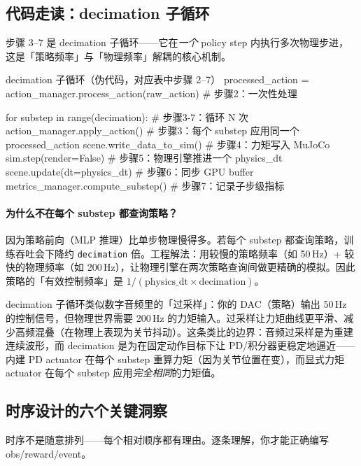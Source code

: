 \subsection{代码走读：decimation 子循环}

步骤 3--7 是 decimation 子循环——它在\emph{一个} policy step 内执行多次物理步进，这是「策略频率」与「物理频率」解耦的核心机制。

\begin{codebox}[Python]{decimation 子循环（伪代码，对应表中步骤 2--7）}
processed_action = action_manager.process_action(raw_action)  # 步骤2：一次性处理

for substep in range(decimation):          # 步骤3-7：循环 N 次
    action_manager.apply_action()          # 步骤3：每个 substep 应用同一个 processed_action
    scene.write_data_to_sim()              # 步骤4：力矩写入 MuJoCo
    sim.step(render=False)                  # 步骤5：物理引擎推进一个 physics_dt
    scene.update(dt=physics_dt)            # 步骤6：同步 GPU buffer
    metrics_manager.compute_substep()      # 步骤7：记录子步级指标
\end{codebox}

\paragraph{为什么不在每个 substep 都查询策略？}因为策略前向（MLP 推理）比单步物理慢得多。若每个 substep 都查询策略，训练吞吐会下降约 \verb|decimation| 倍。工程解法：用较慢的策略频率（如 50\,Hz）+ 较快的物理频率（如 200\,Hz），让物理引擎在两次策略查询间做更精确的模拟。因此策略的「有效控制频率」是 $1/(\text{physics\_dt}\times\text{decimation})$。

\begin{insight}\label{ins:rlmc-mgr-oversample}
decimation 子循环类似数字音频里的「过采样」：你的 DAC（策略）输出 50\,Hz 的控制信号，但物理世界需要 200\,Hz 的力矩输入。过采样让力矩曲线更平滑、减少高频混叠（在物理上表现为关节抖动）。这条类比的边界：音频过采样是为重建连续波形，而 decimation 是为在固定动作目标下让 PD/积分器更稳定地逼近——内建 PD actuator 在每个 substep 重算力矩（因为关节位置在变），而显式力矩 actuator 在每个 substep 应用\emph{完全相同}的力矩值。
\end{insight}

\subsection{时序设计的六个关键洞察}

时序不是随意排列——每个相对顺序都有理由。逐条理解，你才能正确编写 obs/reward/event。

